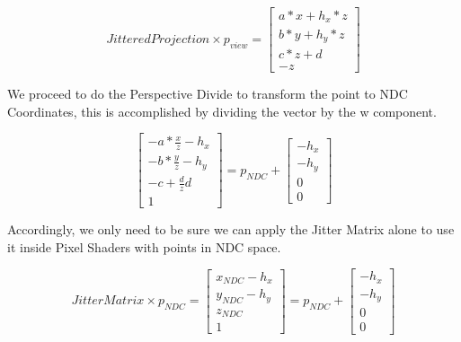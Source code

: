 \documentclass{cslthse-msc}
\begin{document}
\begin{appendices}
\begin{equation}
	JitteredProjection\times p_{view} = \begin{bmatrix*}
	a*x+h_x*z \\
	b*y+h_y*z \\
	c*z+d \\
	-z
	\end{bmatrix*}
\end{equation}

We proceed to do the Perspective Divide to transform the point to NDC Coordinates, this is accomplished by dividing the vector by the w component.

\begin{equation}
\begin{bmatrix*}
-a*\frac{x}{z}-h_x \\
-b*\frac{y}{z}-h_y \\
-c+\frac{d}{z}d \\
1
\end{bmatrix*} = p_{NDC} + \begin{bmatrix*}
-h_x \\
-h_y \\
0 \\
0
\end{bmatrix*}
\end{equation}

Accordingly, we only need to be sure we can apply the Jitter Matrix alone to use it inside Pixel Shaders with points in NDC space. 

\begin{equation}
	JitterMatrix\times p_{NDC} = \begin{bmatrix*}
	x_{NDC}-h_x \\
	y_{NDC}-h_y \\
	z_{NDC} \\
	1
	\end{bmatrix*} = p_{NDC} + \begin{bmatrix*}
	-h_x \\
	-h_y \\
	0 \\
	0
	\end{bmatrix*}
\end{equation}

\end{appendices}
\end{document}
